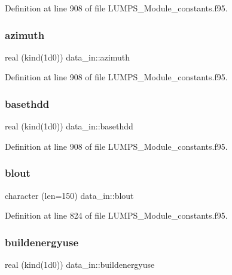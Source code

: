Definition at line 908 of file L\+U\+M\+P\+S\+\_\+\+Module\+\_\+constants.\+f95.

\mbox{\label{namespacedata__in_a0abb9aefbb8c1dc5ac6ff2f770da7faa}} 
\subsubsection{\texorpdfstring{azimuth}{azimuth}}
{\footnotesize\ttfamily real (kind(1d0)) data\+\_\+in\+::azimuth}



Definition at line 908 of file L\+U\+M\+P\+S\+\_\+\+Module\+\_\+constants.\+f95.

\mbox{\label{namespacedata__in_a1e8b73a7f5e115a447c6d8317490a479}} 
\subsubsection{\texorpdfstring{basethdd}{basethdd}}
{\footnotesize\ttfamily real (kind(1d0)) data\+\_\+in\+::basethdd}



Definition at line 908 of file L\+U\+M\+P\+S\+\_\+\+Module\+\_\+constants.\+f95.

\mbox{\label{namespacedata__in_ac7dd014c6f349ee2b4c385f79348fff4}} 
\subsubsection{\texorpdfstring{blout}{blout}}
{\footnotesize\ttfamily character (len=150) data\+\_\+in\+::blout}



Definition at line 824 of file L\+U\+M\+P\+S\+\_\+\+Module\+\_\+constants.\+f95.

\mbox{\label{namespacedata__in_a181898a3db2411958a2a0f484e50a9f1}} 
\subsubsection{\texorpdfstring{buildenergyuse}{buildenergyuse}}
{\footnotesize\ttfamily real (kind(1d0)) data\+\_\+in\+::buildenergyuse}




